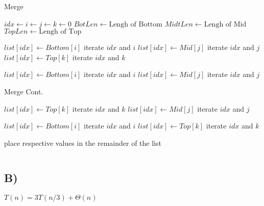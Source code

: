 \documentclass[12pt, letterpaper]{article}
\begin{document}
\begin{algorithm}
\caption{Merge}
\begin{algorithmic}


\State $idx \gets i \gets j \gets k \gets 0$
\State $BotLen \gets \text{Lengh of Bottom}$
\State $MidtLen \gets \text{Lengh of Mid}$
\State $TopLen \gets \text{Lengh of Top}$


		\State $list[idx] \gets Bottom[i]$
		\State iterate $idx$ and $i$
		\State $list[idx] \gets Mid[j]$
		\State iterate $idx$ and $j$
	\Else
		\State $list[idx] \gets Top[k]$
		\State iterate $idx$ and $k$
	\EndIf

\EndWhile

		\State $list[idx] \gets Bottom[i]$
		\State iterate $idx$ and $i$
	\Else
		\State $list[idx] \gets Mid[j]$
		\State iterate $idx$ and $j$
	\EndIf
\EndWhile
\EndProcedure
\end{algorithmic}
\end{algorithm}

\begin{algorithm}
\caption{Merge Cont.}
\begin{algorithmic}
	
		\State $list[idx] \gets Top[k]$
		\State iterate $idx$ and $k$
	\Else
		\State $list[idx] \gets Mid[j]$
		\State iterate $idx$ and $j$
	\EndIf
\EndWhile
	
		\State $list[idx] \gets Bottom[i]$
		\State iterate $idx$ and $i$
	\Else
		\State $list[idx] \gets Top[k]$
		\State iterate $idx$ and $k$
	\EndIf
\EndWhile

\State place respective values in the remainder of the list
\EndWhile
\end{algorithmic}
\end{algorithm}

\[  \]
\[  \]

\subsection*{B)}
$T(n) = 3T(n/3) + \Theta(n)$
\end{document}
